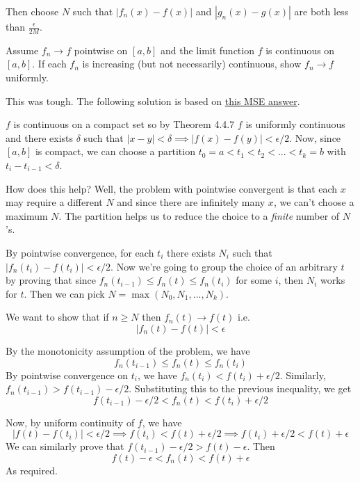 \documentclass{oxmathproblems}
\begin{document}
\begin{questions}
\begin{solution}
\begin{enumerate}[label=(\alph*)]
    Then choose $N$ such that $|f_{n}(x)-f(x)|$ and $|g_{n}(x)-g(x)|$ are both less than $\frac{\epsilon}{2M}$.
  \end{enumerate}
\end{solution}

\miquestion Assume $f_{n} \to f$ pointwise on $[a, b]$ and the limit function $f$ is continuous on $[a, b]$. If each $f_{n}$ is increasing (but not necessarily) continuous, show $f_{n} \to f$ uniformly.
\begin{solution}
  This was tough. The following solution is based on \href{https://math.stackexchange.com/questions/834126/sequence-of-monotone-functions-converging-to-a-continuous-limit-is-the-converge}{this MSE answer}.

  $f$ is continuous on a compact set so by Theorem 4.4.7 $f$ is uniformly continuous and there exists $\delta$ such that $|x-y| < \delta \implies |f(x)-f(y)| < \epsilon/2$.
  Now, since $[a,b]$ is compact, we can choose a partition $t_{0}=a < t_{1} < t_{2} < ... < t_{k}=b$ with $t_{i}-t_{i-1} < \delta$. 

  How does this help? Well, the problem with pointwise convergent is that each $x$ may require a different $N$ and since there are infinitely many $x$, we can't choose a maximum $N$.
  The partition helps us to reduce the choice to a \textit{finite} number of $N$'s. 

  By pointwise convergence, for each $t_{i}$ there exists $N_{i}$ such that $|f_{n}(t_{i})-f(t_{i})| < \epsilon/2$. Now we're going to group the choice of an arbitrary $t$ by proving that
  since $f_{n}(t_{i-1}) \leq f_{n}(t) \leq f_{n}(t_{i})$ for some $i$, then $N_{i}$ works for $t$. Then we can pick $N = \max(N_{0}, N_{1}, ..., N_{k})$.

  We want to show that if $n \geq N$ then $f_{n}(t) \to f(t)$ i.e.
  \[|f_{n}(t)-f(t)| < \epsilon\] 

  By the monotonicity assumption of the problem, we have
  \[f_{n}(t_{i-1}) \leq f_{n}(t) \leq f_{n}(t_{i})\]
  By pointwise convergence on $t_{i}$, we have $f_{n}(t_{i}) < f(t_{i}) + \epsilon/2$. Similarly, $f_{n}(t_{i-1}) > f(t_{i-1}) - \epsilon/2$. Substituting this to the previous inequality, we get
  \[f(t_{i-1})-\epsilon/2 < f_{n}(t) < f(t_{i})+\epsilon/2\]
  
  Now, by uniform continuity of $f$, we have 
  \[|f(t)-f(t_{i})| < \epsilon /2 \implies f(t_{i}) < f(t)+\epsilon/2 \implies f(t_{i})+\epsilon/2 < f(t)+\epsilon\]
  We can similarly prove that $f(t_{i-1})-\epsilon/2 > f(t)-\epsilon$. Then
  \[f(t)-\epsilon < f_{n}(t) < f(t)+\epsilon\]
  As required.


\end{solution}
\end{questions}
\end{document}

